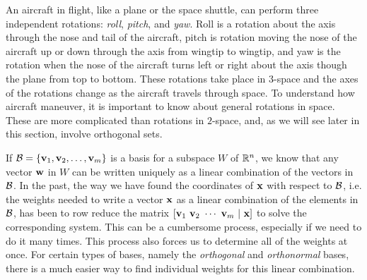  \label{sec:orthogonal_basis}

\vspace*{-17 pt}

\vspace*{13 pt}


An aircraft in flight, like a plane or the space shuttle, can perform three independent rotations: \emph{roll}, \emph{pitch}, and \emph{yaw}. Roll is a rotation about the axis through the nose and tail of the aircraft, pitch is rotation moving the nose of the aircraft up or down through the axis from wingtip to wingtip, and yaw is the rotation when the nose of the aircraft turns left or right about the axis though the plane from top to bottom. These rotations take place in $3$-space and the axes of the rotations change as the aircraft travels through space. To understand how aircraft maneuver, it is important to know about general rotations in space. These are more complicated than rotations in $2$-space, and, as we will see later in this section, involve orthogonal sets. 


If $\mathcal{B} = \{\mathbf{v}_1, \mathbf{v}_2, \ldots, \mathbf{v}_m\}$ is a basis for a subspace $W$ of $\mathbb{R}^n$, we know that any vector $\mathbf{w}$ in $W$ can be written uniquely as a linear combination of the vectors in $\mathcal{B}$. In the past, the way we have found the coordinates of $\mathbf{x}$ with respect to $\mathcal{B}$, i.e. the weights needed to write a vector $\mathbf{x}$ as a linear combination of the elements in $\mathcal{B}$, has been to row reduce the matrix $[\vv_1  \ \vv_2  \ \cdots  \ \vv_m \ | \ \vx]$ to solve the corresponding system. This can be a cumbersome process, especially if we need to do it many times. This process also forces us to determine all of the weights at once. For certain types of bases, namely the \emph{orthogonal} and \emph{orthonormal} bases, there is a much easier way to find individual weights for this linear combination.

